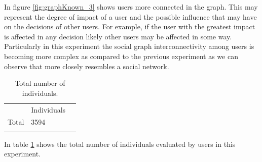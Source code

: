 In figure \ref{fig:graphKnown_3} shows users more connected in the graph. This
may represent the degree of impact of a user and the possible influence that may
have on the decisions of other users. For example, if the user with the greatest
impact is affected in any decision likely other users may be affected in some
way. Particularly in this experiment the social graph interconnectivity among
users is becoming more complex as compared to the previous experiment as we can
observe that more closely resembles a social network.


\begin{table}
\small
\caption{Total number of individuals.}
\label{tab:totalIndividuals_33}
\centering
\small
\begin{tabular}{p{3cm} p{3cm} p{3cm} }
\hline\noalign{\smallskip}
  & Individuals &  \\
\noalign{\smallskip}\hline\noalign{\smallskip}
\small{Total } & \small{3594} & \\ \hline
\noalign{\smallskip}\hline
\end{tabular}
\end{table}

In table \ref{tab:totalIndividuals_33} shows the total number of individuals
evaluated by users in this experiment.

